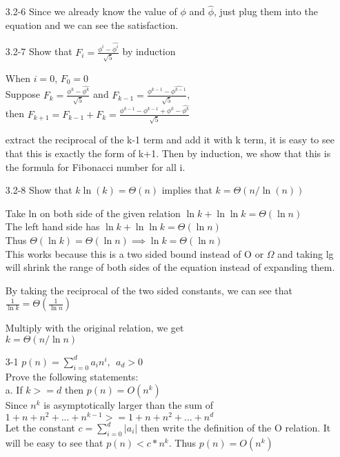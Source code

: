 \documentclass[]{article}
\begin{document}
\begin{enumerate}
\item[3.2-6] Since we already know the value of $\phi$ and $\hat{\phi}$, just plug them into the equation and we can see the satisfaction.

\item[3.2-7] Show that $ F_i = \frac{\phi^i-\hat{\phi^i}}{\sqrt{5}} $ by induction

When $i=0$, $F_0 = 0$\\
Suppose $ F_k =  \frac{\phi^k-\hat{\phi^k}}{\sqrt{5}} $ and $ F_{k-1} =  \frac{\phi^{k-1}-\hat{\phi^{k-1}}}{\sqrt{5}} $, \\then 
$F_{k+1} = F_{k-1} + F_k = \frac{\phi^{k-1}-\hat{\phi^{k-1}} + \phi^k-\hat{\phi^k}}{\sqrt{5}} $

extract the reciprocal of the k-1 term and add it with k term, it is easy to see that this is exactly the form of k+1. Then by induction, we show that this is the formula for Fibonacci number for all i.

\item[3.2-8] Show that $ k\ln(k) = \Theta(n) $ implies that $ k=\Theta(n/\ln(n)) $

Take ln on both side of the given relation
$ \ln k + \ln\ln k = \Theta(\ln n) $\\
The left hand side has $ \ln k+\ln\ln k = \Theta(\ln n) $\\
Thus $ \Theta(\ln k) = \Theta(\ln n) \implies \ln k= \Theta (\ln n) $\\
This works because this is a two sided bound instead of O or $\Omega$ and taking lg will shrink the range of both sides of the equation instead of expanding them.

By taking the reciprocal of the two sided constants, we can see that\\
 $ \frac{1}{\ln k} = \Theta(\frac{1}{\ln n}) $

Multiply with the original relation, we get\\
$ k = \Theta(n/ \ln n) $

\item[3-1] $ p(n) = \sum\limits_{i=0}^{d} a_in^i ,\ \ a_d>0$\\
Prove the following statements:\\
a. If $k>=d$ then $ p(n) = O(n^k) $\\
Since $n^k$ is asymptotically larger than the sum of $ 1+n+n^2+...+n^{k-1} >= 1+n+n^2+...+n^{d} $\\
Let the constant $ c=\sum\limits_{i=0}^{d} |a_i| $ then write the definition of the O relation. It will be easy to see that $ p(n) < c*n^k $. Thus $ p(n) = O(n^k) $


\end{enumerate}
\end{document}
